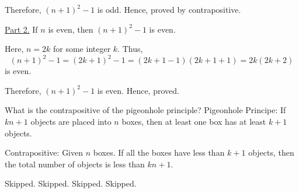 \begin{enumerate}
		Therefore, $(n+1)^2 - 1$ is odd. Hence, proved by contrapositive.
		
		\underline{Part 2.} If $n$ is even, then $(n+1)^2-1$ is even.

		Here, $n = 2k$ for some integer $k$. Thus, 
		$$(n+1)^2 - 1 = (2k+1)^2 - 1 = (2k+1-1)(2k+1+1) = 2k(2k+2)$$
		is even.

		Therefore, $(n+1)^2-1$ is even. Hence, proved.
		\es
\end{enumerate}
\ep

\bp What is the contrapositive of the pigeonhole principle? \ep
\bs
Pigeonhole Principe: If $kn+1$ objects are placed into $n$ boxes, then at least one box has at least $k+1$ objects.

Contrapositive: Given $n$ boxes. If all the boxes have less than $k+1$ objects, then the total number of objects is less than $kn+1$.
\es

\bp Skipped. \ep
\bp Skipped. \ep
\bp Skipped. \ep
\bp Skipped. \ep


